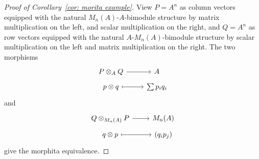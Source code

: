\documentclass[reqno, 12pt]{amsart}
\begin{document}
\begin{proof}[Proof of Corollary~\ref{cor: morita example}]
  View $P = A^n$ as column vectors equipped with the natural $M_n(A)$-$A$-bimodule structure by matrix multiplication on the left, and scalar multiplication on the right, and $Q = A^n$ as row vectors equipped with the natural $A$-$M_n(A)$-bimodule structure by scalar multiplication on the left and matrix multiplication on the right.
  The two morphisms
  $$\begin{tikzcd}[row sep=tiny]
    P \otimes_A Q \arrow{r} & A\\
    p \otimes q \arrow[mapsto]{r} & \sum p_i q_i
  \end{tikzcd}$$
  and
  $$\begin{tikzcd}[row sep=tiny]
    Q \otimes_{M_n(A)} P \arrow{r} & M_n(A)\\
    q \otimes p \arrow[mapsto]{r} & (q_ip_j)
  \end{tikzcd}$$
  give the morphita equivalence.
\end{proof}

\end{document}

